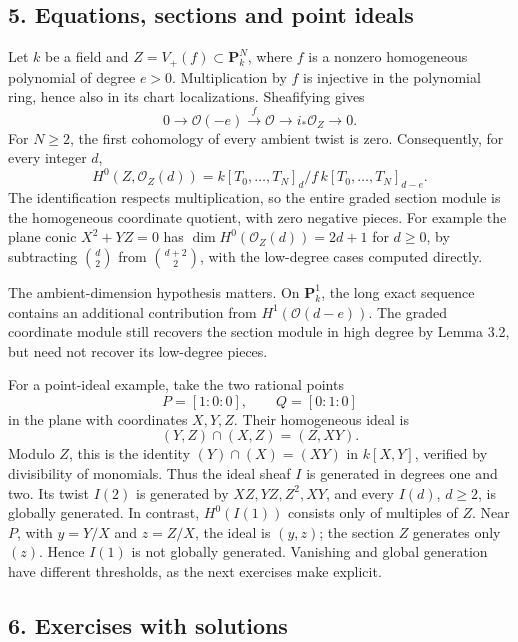 \documentclass[11pt]{article}
\begin{document}
\subsection{5. Equations, sections and point
ideals}\label{equations-sections-and-point-ideals}

Let \(k\) be a field and \(Z=V_+(f)\subset\mathbf P_k^N\), where \(f\)
is a nonzero homogeneous polynomial of degree \(e>0\). Multiplication by
\(f\) is injective in the polynomial ring, hence also in its chart
localizations. Sheafifying gives \[
0\longrightarrow\mathcal O(-e)\xrightarrow{\ f\ }\mathcal O
\longrightarrow i_*\mathcal O_Z\longrightarrow0.
\] For \(N\ge2\), the first cohomology of every ambient twist is zero.
Consequently, for every integer \(d\), \[
H^0(Z,\mathcal O_Z(d))=k[T_0,\ldots,T_N]_d/f\,k[T_0,\ldots,T_N]_{d-e}.
\] The identification respects multiplication, so the entire graded
section module is the homogeneous coordinate quotient, with zero
negative pieces. For example the plane conic \(X^2+YZ=0\) has
\(\dim H^0(\mathcal O_Z(d))=2d+1\) for \(d\ge0\), by subtracting
\(\binom d2\) from \(\binom{d+2}2\), with the low-degree cases computed
directly.

The ambient-dimension hypothesis matters. On \(\mathbf P_k^1\), the long
exact sequence contains an additional contribution from
\(H^1(\mathcal O(d-e))\). The graded coordinate module still recovers
the section module in high degree by Lemma 3.2, but need not recover its
low-degree pieces.

For a point-ideal example, take the two rational points \[
P=[1:0:0],\qquad Q=[0:1:0]
\] in the plane with coordinates \(X,Y,Z\). Their homogeneous ideal is
\[
(Y,Z)\cap(X,Z)=(Z,XY).
\] Modulo \(Z\), this is the identity \((Y)\cap(X)=(XY)\) in \(k[X,Y]\),
verified by divisibility of monomials. Thus the ideal sheaf \(I\) is
generated in degrees one and two. Its twist \(I(2)\) is generated by
\(XZ,YZ,Z^2,XY\), and every \(I(d)\), \(d\ge2\), is globally generated.
In contrast, \(H^0(I(1))\) consists only of multiples of \(Z\). Near
\(P\), with \(y=Y/X\) and \(z=Z/X\), the ideal is \((y,z)\); the section
\(Z\) generates only \((z)\). Hence \(I(1)\) is not globally generated.
Vanishing and global generation have different thresholds, as the next
exercises make explicit.

\subsection{6. Exercises with
solutions}\label{exercises-with-solutions-4}
\end{document}
